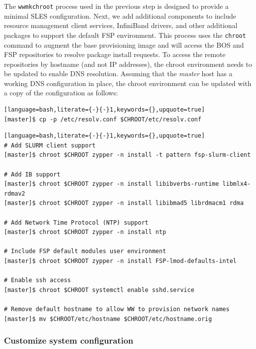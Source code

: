 \documentclass[letterpaper]{article}
\begin{document}
The \texttt{wwmkchroot} process used in the previous step is designed to
provide a minimal SLES configuration. Next, we add additional components to
include resource management client services, InfiniBand drivers, and other
additional packages to support the default FSP environment.  This process uses
the \texttt{chroot} command to augment the base provisioning image and will
access the BOS and FSP repositories to resolve package install requests. To
access the remote repositories by hostname (and not IP addresses), the chroot
environment needs to be updated to enable DNS resolution. Assuming that
the {\em master} host has a working DNS configuration in place, the chroot environment can
be updated with a copy of the configuration as follows:

\begin{lstlisting}[language=bash,literate={-}{-}1,keywords={},upquote=true]
[master]$ cp -p /etc/resolv.conf $CHROOT/etc/resolv.conf
\end{lstlisting}


\begin{lstlisting}[language=bash,literate={-}{-}1,keywords={},upquote=true]
# Add SLURM client support
[master]$ chroot $CHROOT zypper -n install -t pattern fsp-slurm-client

# Add IB support
[master]$ chroot $CHROOT zypper -n install libibverbs-runtime libmlx4-rdmav2
[master]$ chroot $CHROOT zypper -n install libibmad5 librdmacm1 rdma

# Add Network Time Protocol (NTP) support
[master]$ chroot $CHROOT zypper -n install ntp

# Include FSP default modules user environment
[master]$ chroot $CHROOT zypper -n install FSP-lmod-defaults-intel

# Enable ssh access 
[master]$ chroot $CHROOT systemctl enable sshd.service

# Remove default hostname to allow WW to provision network names
[master]$ mv $CHROOT/etc/hostname $CHROOT/etc/hostname.orig
\end{lstlisting}


\subsubsection{Customize system configuration} \label{sec:master_customization}
\end{document}
